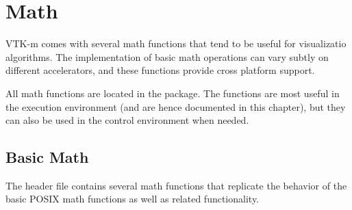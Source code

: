 
\section{Math}


VTK-m comes with several math functions that tend to be useful for
visualizatio algorithms. The implementation of basic math operations can
vary subtly on different accelerators, and these functions provide cross
platform support.

All math functions are located in the \vtkm{} package. The functions are
most useful in the execution environment (and are hence documented in this
chapter), but they can also be used in the control environment when needed.

\subsection{Basic Math}

The  header file contains several math functions
that replicate the behavior of the basic POSIX math functions as well as
related functionality.

